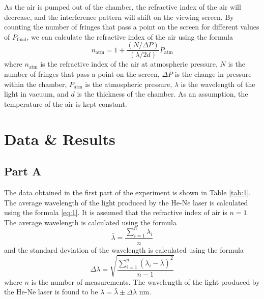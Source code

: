 \documentclass[10pt]{article}
\begin{document}
As the air is pumped out of the chamber, the refractive index of the air will decrease, and the interference pattern will shift on the viewing screen. By counting the number of fringes that pass a point on the screen for different values of $P_{\text{final}}$, we can calculate the refractive index of the air using the formula
\begin{equation}
  n_{\text{atm}} = 1 + \dfrac{\left(N/\Delta P\right)}{\left(\lambda/2d\right)} P_{\text{atm}}
\end{equation}
where $n_{\text{atm}}$ is the refractive index of the air at atmospheric pressure, $N$ is the number of fringes that pass a point on the screen, $\Delta P$ is the change in pressure within the chamber, $P_{\text{atm}}$ is the atmospheric pressure, $\lambda$ is the wavelength of the light in vacuum, and $d$ is the thickness of the chamber. As an assumption, the temperature of the air is kept constant. 

\section{Data \& Results}

\subsection*{Part A}

The data obtained in the first part of the experiment is shown in Table \ref{tab:1}. The average wavelength of the light produced by the He-Ne laser is calculated using the formula \ref{eq:1}. It is assumed that the refractive index of air is $n = 1$. The average wavelength is calculated using the formula
\begin{equation}
  \bar{\lambda} = \dfrac{\sum_{i=1}^{n} \lambda_i}{n}
  \label{eq:3}
\end{equation}
and the standard deviation of the wavelength is calculated using the formula
\begin{equation}
  \Delta \lambda = \sqrt{\dfrac{\sum_{i=1}^{n} \left(\lambda_i - \bar{\lambda}\right)^2}{n-1}}
  \label{eq:4}
\end{equation}
where $n$ is the number of measurements. The wavelength of the light produced by the He-Ne laser is found to be $\lambda = \bar{\lambda} \pm \Delta \lambda$ nm.
\end{document}
